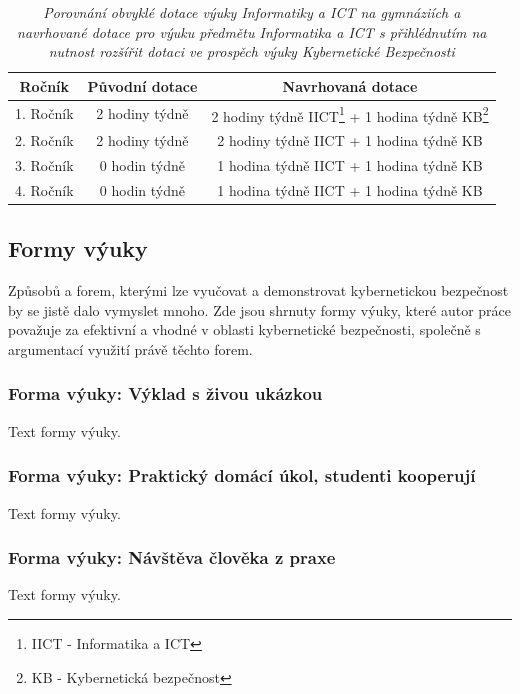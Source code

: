 \documentclass[a4paper, 12pt]{article}
\begin{document}
\renewcommand*\footnoterule{}
\begin{table}[h!]
\begin{minipage}{\textwidth}
\centering
    \begin{tabular}{|c|c|c|}
    \hline
    \textbf{Ročník} & \textbf{Původní dotace} & \textbf{Navrhovaná dotace} \\
    \hline
    1. Ročník & 2 hodiny týdně & 2 hodiny týdně IICT\footnote[1]{ IICT - Informatika a ICT} + 1 hodina týdně KB\footnote[2]{ KB - Kybernetická bezpečnost} \\
    2. Ročník & 2 hodiny týdně & 2 hodiny týdně IICT + 1 hodina týdně KB \\
    3. Ročník & 0 hodin týdně & 1 hodina týdně IICT + 1 hodina týdně KB  \\
    4. Ročník & 0 hodin týdně & 1 hodina týdně IICT + 1 hodina týdně KB  \\
    \hline
    \end{tabular}
    \caption{\textit{Porovnání obvyklé dotace výuky Informatiky a ICT na gymnáziích a navrhované dotace pro výuku předmětu Informatika a ICT s přihlédnutím na nutnost rozšířit dotaci ve prospěch výuky Kybernetické Bezpečnosti}}
\end{minipage}
\end{table}






\subsection{Formy výuky}
Způsobů a forem, kterými lze vyučovat a demonstrovat kybernetickou bezpečnost by se jistě dalo vymyslet mnoho. Zde jsou shrnuty formy výuky, které autor práce považuje za efektivní a vhodné v oblasti kybernetické bezpečnosti, společně s argumentací využití právě těchto forem.

\subsubsection{Forma výuky: Výklad s živou ukázkou}
Text formy výuky.

\subsubsection{Forma výuky: Praktický domácí úkol, studenti kooperují}
Text formy výuky.

\subsubsection{Forma výuky: Návštěva člověka z praxe}
Text formy výuky.
\end{document}
